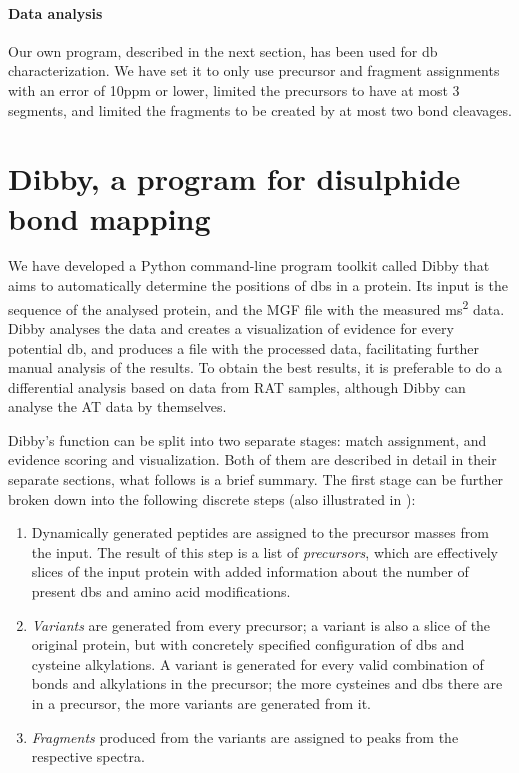\paragraph{Data analysis} Our own program, described in the next section, has been used for \gls*{db} characterization. We have set it to only use precursor and fragment assignments with an error of 10ppm or lower, limited the precursors to have at most 3 segments, and limited the fragments to be created by at most two bond cleavages.

\section{Dibby, a program for disulphide bond mapping}

We have developed a Python command-line program toolkit called Dibby that aims to automatically determine the positions of \glspl*{db} in a protein. Its input is the sequence of the analysed protein, and the MGF file with the measured \gls*{ms}\textsuperscript{2} data. Dibby analyses the data and creates a visualization of evidence for every potential \gls*{db}, and produces a file with the processed data, facilitating further manual analysis of the results. To obtain the best results, it is preferable to do a differential analysis based on data from RAT samples, although Dibby can analyse the AT data by themselves.

Dibby's function can be split into two separate stages: match assignment, and evidence scoring and visualization. Both of them are described in detail in their separate sections, what follows is a brief summary. The first stage can be further broken down into the following discrete steps (also illustrated in ):

\begin{enumerate}
  \item Dynamically generated peptides are assigned to the precursor masses from the input. The result of this step is a list of \emph{precursors}, which are effectively slices of the input protein with added information about the number of present \glspl*{db} and amino acid modifications.
  \item \emph{Variants} are generated from every precursor; a variant is also a slice of the original protein, but with concretely specified configuration of \glspl*{db} and cysteine alkylations. A variant is generated for every valid combination of bonds and alkylations in the precursor; the more cysteines and \glspl*{db} there are in a precursor, the more variants are generated from it.
  \item \emph{Fragments} produced from the variants are assigned to peaks from the respective spectra.
\end{enumerate}

